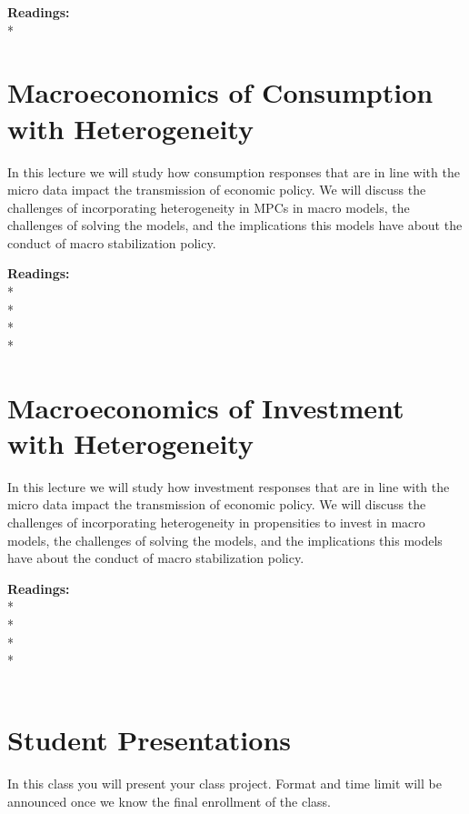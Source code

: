 \documentclass [12pt]{article}
\begin{document}
\noindent\textbf{Readings:}\\
*\\


\section{Macroeconomics of Consumption with Heterogeneity}

In this lecture we will study how consumption responses that are in line with the micro data impact the transmission of economic policy. We will discuss the challenges of incorporating heterogeneity in MPCs in macro models, the challenges of solving the models, and the implications this models have about the conduct of macro stabilization policy.

\noindent\textbf{Readings:}\\
* \\
* \\
* \\
* \\


\section{Macroeconomics of Investment with Heterogeneity}

In this lecture we will study how investment responses that are in line with the micro data impact the transmission of economic policy. We will discuss the challenges of incorporating heterogeneity in propensities to invest in macro models, the challenges of solving the models, and the implications this models have about the conduct of macro stabilization policy.

\noindent\textbf{Readings:}\\
* \\
* \\
* \\
* \\
\\

\section{Student Presentations}

In this class you will present your class project. Format and time limit will be announced once we know the final enrollment of the class.
\end{document}
